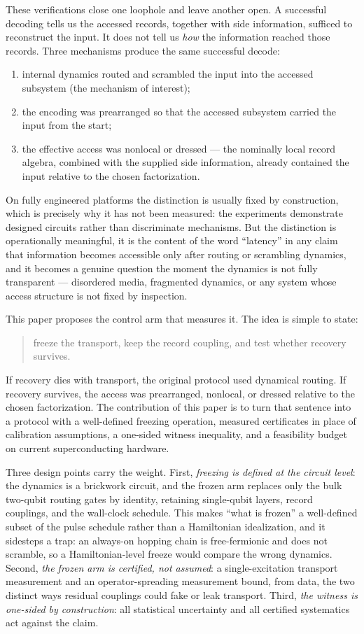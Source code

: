 \documentclass[11pt]{article}
\begin{document}
These verifications close one loophole and leave another open.  A
successful decoding tells us the accessed records, together with side
information, sufficed to reconstruct the input.  It does not tell us
\emph{how} the information reached those records.  Three mechanisms
produce the same successful decode:
\begin{enumerate}
\item internal dynamics routed and scrambled the input into the
  accessed subsystem (the mechanism of interest);
\item the encoding was prearranged so that the accessed subsystem
  carried the input from the start;
\item the effective access was nonlocal or dressed --- the nominally
  local record algebra, combined with the supplied side information,
  already contained the input relative to the chosen factorization.
\end{enumerate}
On fully engineered platforms the distinction is usually fixed by
construction, which is precisely why it has not been measured: the
experiments demonstrate designed circuits rather than discriminate
mechanisms.  But the distinction is operationally meaningful, it is
the content of the word ``latency'' in any claim that information
becomes accessible only after routing or scrambling dynamics, and it
becomes a genuine question the moment the dynamics is not fully
transparent --- disordered media, fragmented dynamics, or any system
whose access structure is not fixed by inspection.

This paper proposes the control arm that measures it.  The idea is
simple to state:
\begin{quote}
  freeze the transport, keep the record coupling, and test whether
  recovery survives.
\end{quote}
If recovery dies with transport, the original protocol used dynamical
routing.  If recovery survives, the access was prearranged, nonlocal,
or dressed relative to the chosen factorization.  The contribution of
this paper is to turn that sentence into a protocol with a
well-defined freezing operation, measured certificates in place of
calibration assumptions, a one-sided witness inequality, and a
feasibility budget on current superconducting hardware.

Three design points carry the weight.  First, \emph{freezing is
defined at the circuit level}: the dynamics is a brickwork circuit,
and the frozen arm replaces only the bulk two-qubit routing gates by
identity, retaining single-qubit layers, record couplings, and the
wall-clock schedule.  This makes ``what is frozen'' a well-defined
subset of the pulse schedule rather than a Hamiltonian idealization,
and it sidesteps a trap: an always-on hopping chain is free-fermionic
and does not scramble, so a Hamiltonian-level freeze would compare
the wrong dynamics.  Second, \emph{the frozen arm is certified, not
assumed}: a single-excitation transport measurement and an
operator-spreading measurement bound, from data, the two distinct
ways residual couplings could fake or leak transport.  Third,
\emph{the witness is one-sided by construction}: all statistical
uncertainty and all certified systematics act against the claim.
\end{document}
